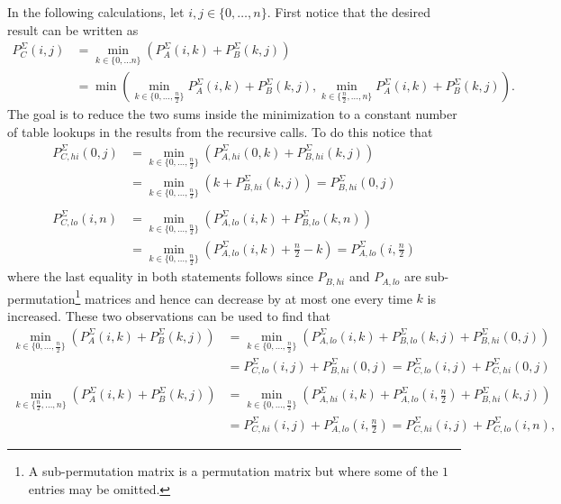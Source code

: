 \documentclass[twoside,11pt,openright]{report}
\begin{document}
In the following calculations, let $i, j \in \{0, \dots, n\}$. First notice that the desired result can be written as
\begin{align*}
  P_C^{\Sigma}(i, j) &= \min_{k \in \{0, \dots n\}} \left( P_A^{\Sigma}(i, k) + P_B^{\Sigma}(k, j) \right) \\
    &= \min\left( \min_{k \in \{0, \dots, \frac{n}{2}\}} {P_A^{\Sigma}(i, k) + P_B^{\Sigma}(k, j)}, \min_{k \in \{\frac{n}{2}, \dots, n\}} {P_A^{\Sigma}(i, k) + P_B^{\Sigma}(k, j)} \right).
\end{align*}
The goal is to reduce the two sums inside the minimization to a constant number of table lookups in the results from the recursive calls. To do this notice that
\begin{align*}
  P_{C,hi}^{\Sigma}(0, j) &= \min_{k \in \{0, \dots, \frac{n}{2}\}} \left( P_{A,hi}^{\Sigma}(0, k) + P_{B,hi}^{\Sigma}(k, j) \right) \\
    &= \min_{k \in \{0, \dots, \frac{n}{2}\}} \left( k + P_{B,hi}^{\Sigma}(k, j) \right) = P_{B,hi}^{\Sigma}(0, j)
  \\ \\
  P_{C,lo}^{\Sigma}(i, n) &= \min_{k \in \{0, \dots, \frac{n}{2}\}} \left( P_{A,lo}^{\Sigma}(i, k) + P_{B,lo}^{\Sigma}(k, n) \right) \\
    &= \min_{k \in \{0, \dots, \frac{n}{2}\}} \left( P_{A,lo}^{\Sigma}(i, k) + \frac{n}{2} - k \right)
    = P_{A,lo}^{\Sigma}(i, \frac{n}{2})
\end{align*}
where the last equality in both statements follows since $P_{B,hi}$ and $P_{A,lo}$ are sub-permutation\footnote{A sub-permutation matrix is a permutation matrix but where some of the $1$ entries may be omitted.} matrices and hence can decrease by at most one every time $k$ is increased. These two observations can be used to find that
\begin{align*}
  \min_{k \in \{0, \dots, \frac{n}{2}\}} \left( P_A^{\Sigma}(i, k) + P_B^{\Sigma}(k, j) \right)
    &= \min_{k \in \{0, \dots, \frac{n}{2}\}} \left( P_{A,lo}^{\Sigma}(i, k) + P_{B,lo}^{\Sigma}(k, j) + P_{B,hi}^{\Sigma}(0, j) \right) \\
    &= P_{C,lo}^{\Sigma}(i, j) + P_{B,hi}^{\Sigma}(0, j)
    = P_{C,lo}^{\Sigma}(i, j) + P_{C,hi}^{\Sigma}(0, j)
  \\ \\
  \min_{k \in \{\frac{n}{2}, \dots, n\}} \left( P_A^{\Sigma}(i, k) + P_B^{\Sigma}(k, j) \right)
    &= \min_{k \in \{0, \dots, \frac{n}{2}\}} \left( P_{A,hi}^{\Sigma}(i, k) + P_{A,lo}^{\Sigma}(i, \frac{n}{2}) + P_{B,hi}^{\Sigma}(k, j) \right) \\
    &= P_{C,hi}^{\Sigma}(i, j) + P_{A,lo}^{\Sigma}(i, \frac{n}{2})
    = P_{C,hi}^{\Sigma}(i, j) + P_{C,lo}^{\Sigma}(i, n),
\end{align*}
\end{document}
